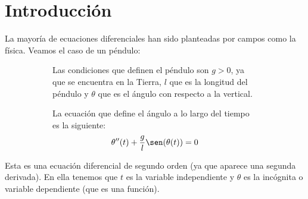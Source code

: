 \setcounter{chapter}{-1} %

\chapter{Introducción}

La mayoría de ecuaciones diferenciales han sido planteadas por campos como la física. Veamos el caso de un péndulo:

\begin{figure}[H]
    \centering
    \begin{subfigure}{0.3\textwidth}
        \centering        

        \vspace*{0.25cm}
    \end{subfigure}
    \hfill
    \begin{subfigure}{0.6\textwidth}%
        Las condiciones que definen el péndulo son $g >0$, ya que se encuentra en la Tierra, $l$ que es la longitud del péndulo y $\theta$ que es el ángulo con respecto a la vertical.

        La ecuación que define el ángulo a lo largo del tiempo es la siguiente:
        \begin{gather*}
            \theta''(t) + \frac{g}{l} \sen(\theta(t)) = 0
        \end{gather*}
    \end{subfigure}
    \hfill
\end{figure}

Esta es una ecuación diferencial de segundo orden (ya que aparece una segunda derivada). En ella tenemos que $t$ es la variable independiente y $\theta$ es la incógnita o variable dependiente (que es una función).

